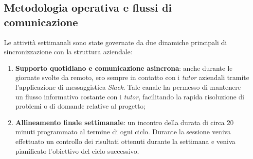 \subsection{Metodologia operativa e flussi di comunicazione}
Le attività settimanali sono state governate da due dinamiche principali di sincronizzazione con la struttura aziendale:
\begin{enumerate}
    \item \textbf{Supporto quotidiano e comunicazione asincrona}: anche durante le giornate svolte da remoto, ero sempre in contatto con i \textit{tutor} aziendali tramite l'applicazione di messaggistica \textit{Slack}. 
    Tale canale ha permesso di mantenere un flusso informativo costante con i \textit{tutor}, facilitando la rapida risoluzione di problemi o di domande relative al progetto;
    \item \textbf{Allineamento finale settimanale}: un incontro della durata di circa 20 minuti programmato al termine di ogni ciclo. Durante la sessione veniva effettuato un controllo dei risultati ottenuti durante la settimana e veniva pianificato l'obiettivo del ciclo successivo.
\end{enumerate}

